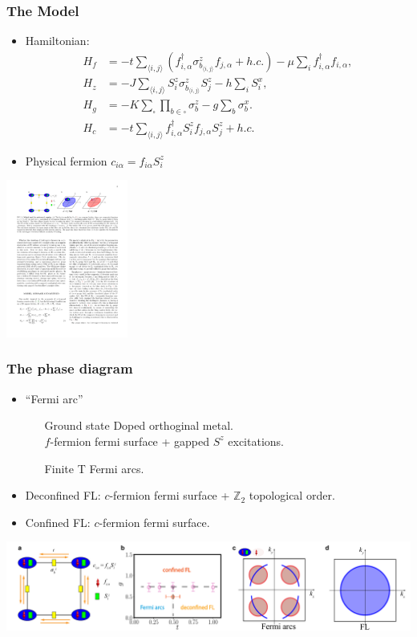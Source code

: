 \documentclass[xcolor=table, 10pt, aspectratio=43]{beamer}
\begin{document}
\begin{frame}
	\frametitle{The Model}
\begin{itemize}
\item Hamiltonian:
	\begin{align*}
	H_f &= -t\sum_{\langle i,j \rangle} (f^{\dagger}_{i,\alpha} \sigma^{z}_{b_{\langle i,j \rangle}}f_{j,\alpha} + h.c.) -\mu\sum_{i}f^{\dagger}_{i,\alpha}f_{i,\alpha}, \nonumber\\
	H_{z} &= -J \sum_{\langle i,j \rangle} S^{z}_{i} \sigma^{z}_{b_{\langle i,j \rangle}} S^{z}_{j} - h \sum_{i} S^{x}_{i}, \nonumber\\
	H_{g} &= -K \sum_{\square}\prod_{b\in\square} \sigma^{z}_{b} - g\sum_{b} \sigma^{x}_{b}.\\
	H_{c} &= -t \sum_{\langle i,j\rangle} f^{\dagger}_{i,\alpha}S^{z}_{i}f_{j,\alpha}S^{z}_{j} + h.c.
\end{align*}
\item Physical fermion $c_{i\alpha} = f_{i\alpha}S_i^z$
\end{itemize}
\begin{center}
	\includegraphics[width=4cm]{model_l}
\end{center}
\end{frame}

\begin{frame}
	\frametitle{The phase diagram}
	\begin{itemize}
		\item ``Fermi arc''
		\begin{itemize}
			\item[Ground state] Doped orthoginal metal.\\
			$f$-fermion fermi surface + gapped $S^z$ excitations.
			\item[Finite T] Fermi arcs.
		\end{itemize}
		\item Deconfined FL: $c$-fermion fermi surface + $\mathbb Z_2$ topological order.
		\item Confined FL: $c$-fermion fermi surface.
	\end{itemize}
	\includegraphics[width=\textwidth]{doped_pd}
\end{frame}
\end{document}
